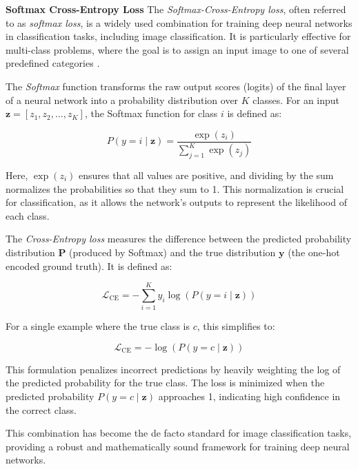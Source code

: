 \myindent \textbf{Softmax Cross-Entropy Loss}
The \textit{Softmax-Cross-Entropy loss}, often referred to as \textit{softmax loss}, is a widely used combination for training deep neural networks in classification tasks, including image classification. It is particularly effective for multi-class problems, where the goal is to assign an input image to one of several predefined categories \cite{cs231n} \cite{pytorch_crossentropy}.

The \textit{Softmax} function transforms the raw output scores (logits) of the final layer of a neural network into a probability distribution over \( K \) classes. For an input \( \mathbf{z} = [z_1, z_2, \dots, z_K] \), the Softmax function for class \( i \) is defined as:

\begin{equation}
    P(y = i \mid \mathbf{z}) = \frac{\exp(z_i)}{\sum_{j=1}^{K} \exp(z_j)}
\end{equation}

Here, \( \exp(z_i) \) ensures that all values are positive, and dividing by the sum normalizes the probabilities so that they sum to 1. This normalization is crucial for classification, as it allows the network's outputs to represent the likelihood of each class.

The \textit{Cross-Entropy loss} measures the difference between the predicted probability distribution \( \mathbf{P} \) (produced by Softmax) and the true distribution \( \mathbf{y} \) (the one-hot encoded ground truth). It is defined as:

\begin{equation}
    \mathcal{L}_{\text{CE}} = -\sum_{i=1}^{K} y_i \log(P(y = i \mid \mathbf{z}))
\end{equation}


For a single example where the true class is \( c \), this simplifies to:

\begin{equation}
    \mathcal{L}_{\text{CE}} = -\log(P(y = c \mid \mathbf{z}))
\end{equation}


This formulation penalizes incorrect predictions by heavily weighting the log of the predicted probability for the true class. The loss is minimized when the predicted probability \( P(y = c \mid \mathbf{z}) \) approaches 1, indicating high confidence in the correct class.

This combination has become the de facto standard for image classification tasks, providing a robust and mathematically sound framework for training deep neural networks.


